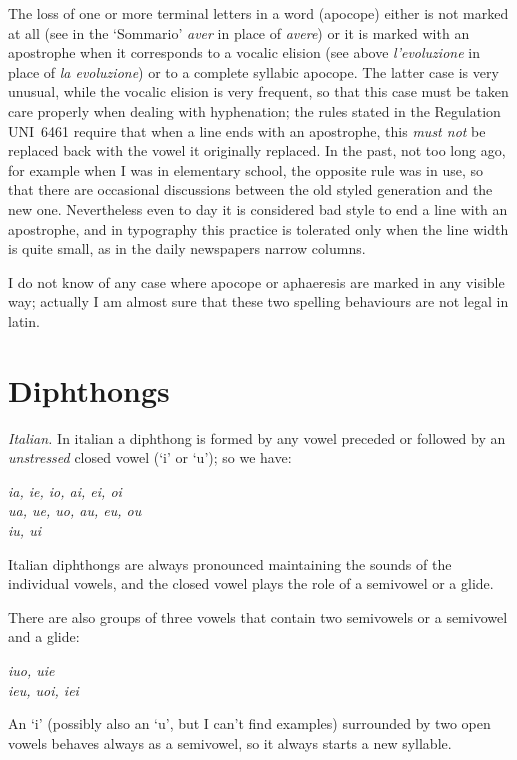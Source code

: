 The  loss  of one or more terminal letters in a word (apocope) either is not
marked at all (see in the `Sommario' {\it aver} in place of  {\it  avere\/})
or  it is marked with an apostrophe when it corresponds to a vocalic elision
(see above {\it l'evoluzione} in place of {\it la  evoluzione\/})  or  to  a
complete  syllabic  apocope.  The  latter  case  is  very unusual, while the
vocalic elision is very frequent, so that  this  case  must  be  taken  care
properly  when  dealing with hyphenation; the rules stated in the Regulation
UNI~6461 \cite{6461} require that when a line ends with an apostrophe,  this
{\it  must  not}  be replaced back with the vowel it originally replaced. In
the past, not too long ago, for example when I was in elementary school, the
opposite  rule  was in use, so that there are occasional discussions between
the old styled generation and the new one. Nevertheless even to  day  it  is
considered  bad  style  to  end a line with an apostrophe, and in typography
this practice is tolerated only when the line width is quite  small,  as  in
the daily newspapers narrow columns.

 I do not know of any case where apocope or aphaeresis
are marked in any visible way; actually I am  almost  sure  that  these  two
spelling behaviours are not legal in latin.

\section{Diphthongs}
{\it  Italian.}  In  italian  a diphthong is formed by any vowel preceded or
followed by an {\it unstressed} closed vowel (`i' or `u'); so we have:
 \begin{center}
\it  ia, ie, io,  ai, ei, oi  \\
     ua, ue, uo,  au, eu, ou  \\
             iu,  ui
\end{center}

Italian  diphthongs  are  always  pronounced  maintaining  the sounds of the
individual vowels, and the closed vowel plays the role of a semivowel  or  a
glide.

There  are  also  groups  of  three  vowels that contain two semivowels or a
semivowel and a glide:
 \begin{center}\it
iuo, uie \\
ieu, uoi, iei
\end{center}

An  `i'  (possibly also an `u', but I can't find examples) surrounded by two
open vowels behaves always as  a  semivowel,  so  it  always  starts  a  new
syllable.

